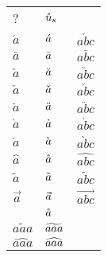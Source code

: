 \documentclass{article}
\begin{document}
\begin{tabular}{ll|l}
? & $\mathaccent'27{u}_s$\\
$\acute{a}$ & $\mathaccent"7013{a}$ & $\acute{abc}$\\
$\bar{a}$   & $\mathaccent"7016{a}$ & $\bar{abc}$\\
$\breve{a}$ & $\mathaccent"7015{a}$ & $\breve{abc}$\\
$\check{a}$ & $\mathaccent"7014{a}$ & $\check{abc}$\\
$\ddot{a}$  & $\mathaccent"707F{a}$ & $\ddot{abc}$\\
$\dot{a}$   & $\mathaccent"705F{a}$ & $\dot{abc}$\\
$\grave{a}$ & $\mathaccent"7012{a}$ & $\grave{abc}$\\
$\hat{a}$   & $\mathaccent"705E{a}$ & $\hat{abc}$\\
$\tilde{a}$ & $\mathaccent"707E{a}$ & $\tilde{abc}$\\
$\vec{a}$   & $\mathaccent"017E{a}$ & $\vec{abc}$\\
            & $\mathaccent"7017{a}$ \\
$\widetilde{aaa}$   & $\mathaccent"0365{aaa}$ \\
$\widehat{aaa}$     & $\mathaccent"0362{aaa}$ \\
\end{tabular}
\end{document}
